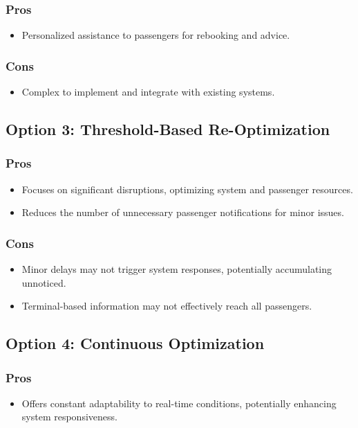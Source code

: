 \subsubsection*{Pros}
\begin{itemize}
    \item Personalized assistance to passengers for rebooking and advice.
\end{itemize}
\subsubsection*{Cons}
\begin{itemize}
    \item Complex to implement and integrate with existing systems.
\end{itemize}

\subsection*{Option 3: Threshold-Based Re-Optimization}
\subsubsection*{Pros}
\begin{itemize}
    \item Focuses on significant disruptions, optimizing system and passenger resources.
    \item Reduces the number of unnecessary passenger notifications for minor issues.
\end{itemize}
\subsubsection*{Cons}
\begin{itemize}
    \item Minor delays may not trigger system responses, potentially accumulating unnoticed.
    \item Terminal-based information may not effectively reach all passengers.
\end{itemize}

\subsection*{Option 4: Continuous Optimization}
\subsubsection*{Pros}
\begin{itemize}
    \item Offers constant adaptability to real-time conditions, potentially enhancing system responsiveness.
\end{itemize}
